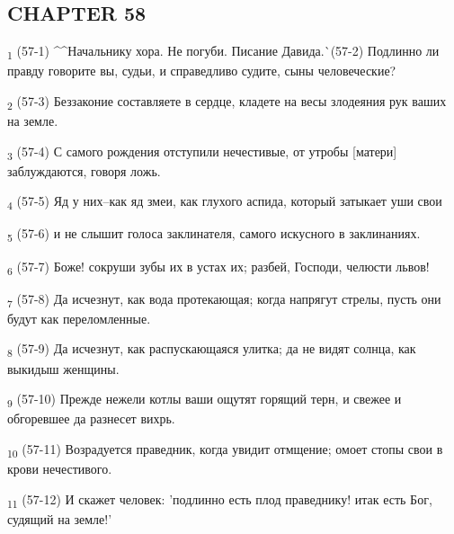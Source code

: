 \subsection{CHAPTER 58}
\begin{tcolorbox}
\textsubscript{1} (57-1) ^^Начальнику хора. Не погуби. Писание Давида.^^ (57-2) Подлинно ли правду говорите вы, судьи, и справедливо судите, сыны человеческие?
\end{tcolorbox}
\begin{tcolorbox}
\textsubscript{2} (57-3) Беззаконие составляете в сердце, кладете на весы злодеяния рук ваших на земле.
\end{tcolorbox}
\begin{tcolorbox}
\textsubscript{3} (57-4) С самого рождения отступили нечестивые, от утробы [матери] заблуждаются, говоря ложь.
\end{tcolorbox}
\begin{tcolorbox}
\textsubscript{4} (57-5) Яд у них--как яд змеи, как глухого аспида, который затыкает уши свои
\end{tcolorbox}
\begin{tcolorbox}
\textsubscript{5} (57-6) и не слышит голоса заклинателя, самого искусного в заклинаниях.
\end{tcolorbox}
\begin{tcolorbox}
\textsubscript{6} (57-7) Боже! сокруши зубы их в устах их; разбей, Господи, челюсти львов!
\end{tcolorbox}
\begin{tcolorbox}
\textsubscript{7} (57-8) Да исчезнут, как вода протекающая; когда напрягут стрелы, пусть они будут как переломленные.
\end{tcolorbox}
\begin{tcolorbox}
\textsubscript{8} (57-9) Да исчезнут, как распускающаяся улитка; да не видят солнца, как выкидыш женщины.
\end{tcolorbox}
\begin{tcolorbox}
\textsubscript{9} (57-10) Прежде нежели котлы ваши ощутят горящий терн, и свежее и обгоревшее да разнесет вихрь.
\end{tcolorbox}
\begin{tcolorbox}
\textsubscript{10} (57-11) Возрадуется праведник, когда увидит отмщение; омоет стопы свои в крови нечестивого.
\end{tcolorbox}
\begin{tcolorbox}
\textsubscript{11} (57-12) И скажет человек: 'подлинно есть плод праведнику! итак есть Бог, судящий на земле!'
\end{tcolorbox}

